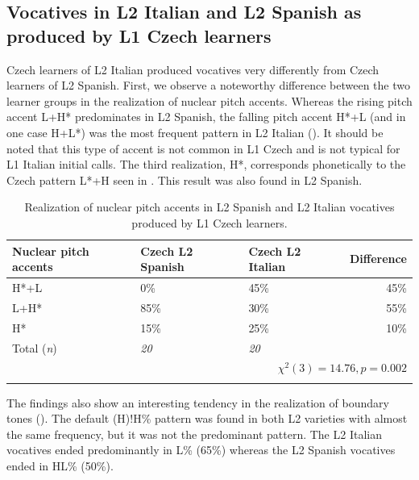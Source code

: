 \subsection{Vocatives in L2 Italian and L2 Spanish as produced by L1 Czech learners}\label{sec:4.5.3}

Czech learners of L2 Italian produced vocatives very differently from Czech learners of L2 Spanish. First, we observe a noteworthy difference between the two learner groups in the realization of nuclear pitch accents. Whereas the rising pitch accent L+H* predominates in L2 Spanish, the falling pitch accent H*+L (and in one case H+L*) was the most frequent pattern in L2 Italian (). It should be noted that this type of accent is not common in L1 Czech and is not typical for L1 Italian initial calls. The third realization, H*, corresponds phonetically to the Czech pattern L*+H seen in . This result was also found in L2 Spanish.

\begin{table}
\begin{tabularx}{\textwidth}{lYYr}

\lsptoprule

{Nuclear pitch accents} & {Czech L2 Spanish} & {Czech L2 Italian} & {Difference}\\
\midrule
H*+L &  0\% & 45\% &  45\%\\
L+H* &  85\% &  30\% &  55\%\\
H* &  15\% &  25\% &  10\%\\
\midrule
Total (\textit{n}) & {\itshape 20} & {\itshape 20} &  \\
\\
\lspbottomrule
\end{tabularx}

\caption{Realization of nuclear pitch accents in L2 Spanish and L2 Italian vocatives produced by L1 Czech learners.}
\label{tab:4.37}
\end{table}

The findings also show an interesting tendency in the realization of boundary tones (). The default (H)!H\% pattern was found in both L2 varieties with almost the same frequency, but it was not the predominant pattern. The L2 Italian vocatives ended predominantly in L\% (65\%) whereas the L2 Spanish vocatives ended in HL\% (50\%).

